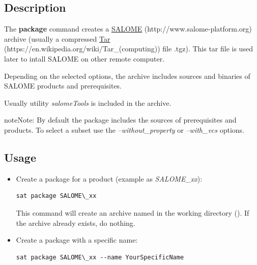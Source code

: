 \documentclass[a4paper,10pt,english]{sphinxmanual}
\begin{document}
\subsection{Description}
\label{commands/package:description}
The \textbf{package} command creates a \href{http://www.salome-platform.org}{SALOME} (http://www.salome-platform.org) archive (usually a compressed \href{https://en.wikipedia.org/wiki/Tar\_(computing)}{Tar} (https://en.wikipedia.org/wiki/Tar\_(computing)) file .tgz).
This tar file is used later to intall SALOME on other remote computer.

Depending on the selected options, the archive includes sources and binaries
of SALOME products and prerequisites.

Usually utility \emph{salomeTools} is included in the archive.

\begin{notice}{note}{Note:}
By default the package includes the sources of prerequisites and products.
To select a subset use the \emph{--without\_property} or \emph{--with\_vcs} options.
\end{notice}


\subsection{Usage}
\label{commands/package:usage}\begin{itemize}
\item {} 
Create a package for a product (example as \emph{SALOME\_xx}):

\begin{Verbatim}[commandchars=\\\{\}]
sat package SALOME\_xx
\end{Verbatim}

This command will create an archive named 
in the working directory ().
If the archive already exists, do nothing.

\item {} 
Create a package with a specific name:

\begin{Verbatim}[commandchars=\\\{\}]
sat package SALOME\_xx --name YourSpecificName
\end{Verbatim}

\end{itemize}
\end{document}
